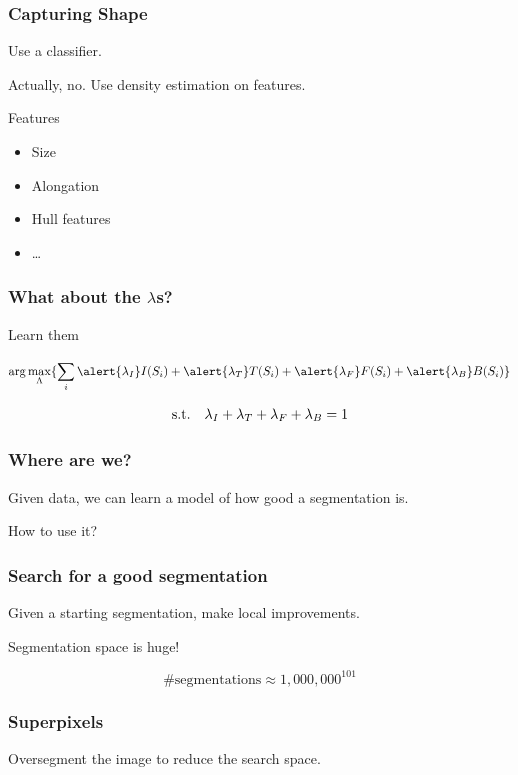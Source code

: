 \documentclass{beamer}
\begin{document}
\begin{frame}[fragile]
\frametitle{Capturing Shape}

Use a classifier.
\pause
\bigskip

Actually, no. Use density estimation on features.
\pause
\bigskip

\begin{block}{Features}
\begin{itemize}
\item Size
\item Alongation
\item Hull features
\item \dots
\end{itemize}
\end{block}

\end{frame}

\begin{frame}[fragile]
\frametitle{What about the $\lambda$s?}

Learn them

\[
\arg\max_{\Lambda} \{ \sum_{i}^{} \alert{\lambda_I} I(S_i) + \alert{\lambda_T} T(S_i) + \alert{\lambda_F} F(S_i) + \alert{\lambda_B} B(S_i) \}
\]

\pause

\[
\text{s.t.\hspace{1em}} \lambda_I + \lambda_T + \lambda_F + \lambda_B = 1
\]

\end{frame}

\begin{frame}[fragile]
\frametitle{Where are we?}

Given data, we can learn a model of \alert{how good} a segmentation is.

\pause

How to use it?

\end{frame}

\begin{frame}[fragile]
\frametitle{Search for a good segmentation}

Given a \alert{starting segmentation}, make local improvements.

\pause
\bigskip
Segmentation space is huge!

\[
\#\text{segmentations} \approx 1,000,000^{101}
\]

\end{frame}

\begin{frame}[fragile]
\frametitle{Superpixels}

Oversegment the image to reduce the search space.

\end{frame}
\end{document}
